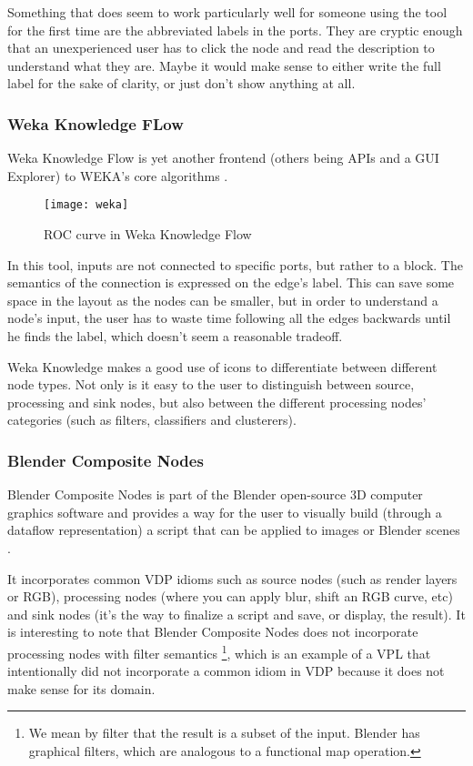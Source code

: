 \begin{itemsize}
Something that does seem to work particularly well for someone using the tool
for the first time are the abbreviated labels in the ports. They are cryptic
enough that an unexperienced user has to click the node and read the description
to understand what they are. Maybe it would make sense to either write the full
label for the sake of clarity, or just don't show anything at all.

\subsubsection{Weka Knowledge FLow}

Weka Knowledge Flow is yet another frontend (others being APIs and a GUI Explorer)
to WEKA's core algorithms \cite{weka}.

\begin{figure}[t]
  \begin{center}
    \leavevmode
    \texttt{[image: weka]}
    \caption{ROC curve in Weka Knowledge Flow \cite{weka}}
    \label{fig:weka}
  \end{center}
\end{figure}

In this tool, inputs are not connected to specific ports, but rather to a block.
The semantics of the connection is expressed on the edge's label. This can save
some space in the layout as the nodes can be smaller, but in order to understand
a node's input, the user has to waste time following all the edges backwards
until he finds the label, which doesn't seem a reasonable tradeoff.

Weka Knowledge makes a good use of icons to differentiate between different node
types. Not only is it easy to the user to distinguish between source, processing
and sink nodes, but also between the different processing nodes' categories
(such as filters, classifiers and clusterers).

\subsubsection{Blender Composite Nodes}

Blender Composite Nodes is part of the Blender open-source 3D computer graphics
software and provides a way for the user to visually build (through a dataflow
representation) a script that can be applied to images or Blender scenes \cite{blender}.

It incorporates common VDP idioms such as source nodes (such as render layers or
RGB), processing nodes (where you can apply blur, shift an RGB curve, etc) and
sink nodes (it's the way to finalize a script and save, or display, the result).
It is interesting to note that
Blender Composite Nodes does not incorporate processing nodes with filter semantics
\footnote{We mean by filter that the result is a subset of the input. Blender has
graphical filters, which are analogous to a functional map operation.},
which is an example of a VPL that intentionally did not incorporate a common
idiom in VDP because it does not make sense for its domain.


\end{itemsize}

